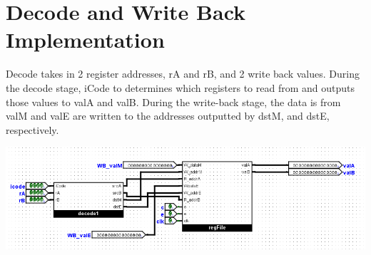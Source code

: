 \documentclass{article}
\begin{document}
\section{Decode and Write Back Implementation}
Decode takes in 2 register addresses, rA and rB, and 2 write back values. During the decode stage, iCode to determines which registers to read from and outputs those values to valA and valB. During the write-back stage, the data is from valM and valE are written to the addresses outputted by dstM, and dstE, respectively. 
\begin{center}
    \includegraphics[scale=.6]{decode.png} \\
\end{center}
\end{document}
